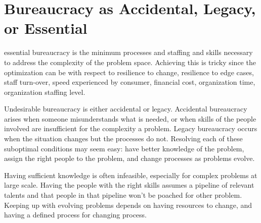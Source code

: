 \section{Bureaucracy as Accidental, Legacy, or Essential}
\gls{essential bureaucracy} is the minimum processes and staffing and skills necessary to address the complexity of the problem space. Achieving this is tricky since the optimization can be with respect to resilience to change, resilience to edge cases, staff turn-over, speed experienced by consumer, financial cost, organization time, organization staffing level.

Undesirable bureaucracy is either accidental or legacy. Accidental bureaucracy arises when someone misunderstands what is needed, or when skills of the people involved are insufficient for the complexity a problem. Legacy bureaucracy occurs when the situation changes but the processes do not. Resolving each of these suboptimal conditions may seem easy: have better knowledge of the problem, assign the right people to the problem, and change processes as problems evolve. 

Having sufficient knowledge is often infeasible, especially for complex problems at large scale. Having the people with the right skills assumes a pipeline of relevant talents and that people in that pipeline won't be poached for other problem. Keeping up with evolving problems depends on having resources to change, and having a defined process for changing process. 